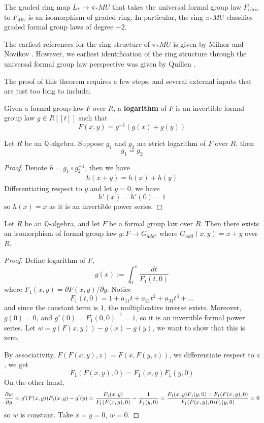 \begin{theorem}
    \cite{ChrQuillen}\cite{PreRavenelGreen}
    The graded ring map $L_*\to \pi_*MU$ that takes the universal formal group law $F_{Univ}$ to $F_{MU}$ is an isomorphism of graded ring. In particular, the ring $\pi_*MU$ classifies graded formal group laws of degree $-2$.
\end{theorem}
The earliest references for the ring structure of $\pi_*MU$ is given by Milnor \cite{ChrMilnorCobordism} and Novikov \cite{ChrNovikov2} \cite{ChrNovikov3}. However, we earliest identification of the ring structure through the universal formal group law perspective was given by Quillen \cite{ChrQuillen}.

The proof of this theorem requires a few steps, and several external inputs that are just too long to include. 
\begin{definition}
    Given a formal group law $F$ over $R$, a \textbf{logarithm} of $F$ is an invertible formal group law $g\in R[[t]]$ such that
    \[
    F(x,y)=g^{-1}(g(x)+g(y))
    \]
\end{definition}
\begin{lemma}
    Let $R$ be an $\mathbb{Q}$-algebra. Suppose $g_1$ and $g_2$ are strict logarithm of $F$ over $R$, then 
    \[
    g_1=g_2
    \]
\end{lemma}
\begin{proof}
    Denote $h=g_1\circ g_2^{-1}$, then we have 
    \begin{align*}
        h(x+y)=h(x)+h(y)
    \end{align*}Differentiating respect to $y$ and let $y=0$, we have 
    \[
    h'(x)=h'(0)=1
    \]so $h(x)=x$ as it is an invertible power series.
\end{proof}
\begin{lemma}
   \cite{PreRavenelGreen}
    Let $R$ be an $\mathbb{Q}$-algebra, and let $F$ be a formal group law over $R$. Then there exists an isomorphism of formal group law $g: F\to G_{add}$, where $G_{add}(x,y)=x+y$ over $R$.
\end{lemma}
\begin{proof}
    Define logarithm of $F$,
    \[
    g(x):=\int_{0}^x \frac{dt}{F_1(t, 0)}
    \]where $F_1(x,y)=\partial F(x,y)/\partial y$. Notice 
    \[
    F_1(t,0)=1+a_{11}t+a_{21}t^2+a_{31}t^3+...
    \]and since the constant term is $1$, the multiplicative inverse exists. Moreover, $g(0)=0$, and $g'(0)=F_1(0,0)^{-1}=1$, so it is an invertible formal power series. Let $w=g(F(x,y))-g(x)-g(y)$, we want to show that this is zero.

    By associativity, $F(F(x,y),z)=F(x,F(y,z))$, we differentiate respect to $z$, we get 
    \[
    F_1(F(x,y), 0)=F_1(x, y) F_1(y,0)
    \]On the other hand,
    \[
    \frac{\partial w}{\partial y}= g'(F(x,y))F_1(x,y)-g'(y)
    \\=\frac{F_1(x,y)}{F_1(F(x,y), 0)}-\frac{1}{F_1(y, 0)}
    \\=\frac{F_1(x,y)F_1(y, 0)-F_1(F(x,y), 0)}{F_1(F(x,y), 0)F_1(y, 0)}
    \\=0
    \]so $w$ is constant. Take $x=y=0$, $w=0$.
\end{proof}

